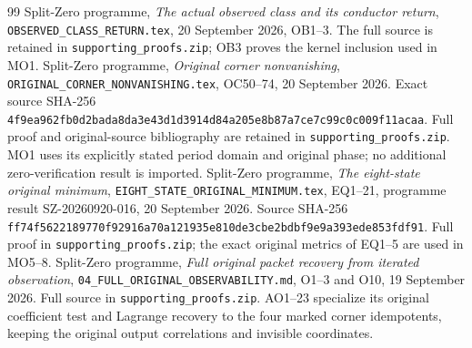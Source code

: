 \documentclass[11pt]{article}
\begin{document}
\begin{thebibliography}{99}
 Split-Zero programme, \emph{The actual observed class and its conductor return}, \texttt{OBSERVED\_CLASS\_RETURN.tex}, 20 September 2026, OB1--3. The full source is retained in \texttt{supporting\_proofs.zip}; OB3 proves the kernel inclusion used in MO1.
 Split-Zero programme, \emph{Original corner nonvanishing}, \texttt{ORIGINAL\_CORNER\_NONVANISHING.tex}, OC50--74, 20 September 2026. Exact source SHA-256 \texttt{4f9ea962fb0d2bada8da3e43d1d3914d84a205e8b87a7ce7c99c0c009f11acaa}. Full proof and original-source bibliography are retained in \texttt{supporting\_proofs.zip}. MO1 uses its explicitly stated period domain and original phase; no additional zero-verification result is imported.
 Split-Zero programme, \emph{The eight-state original minimum}, \texttt{EIGHT\_STATE\_ORIGINAL\_MINIMUM.tex}, EQ1--21, programme result SZ-20260920-016, 20 September 2026. Source SHA-256 \texttt{ff74f5622189770f92916a70a121935e810de3cbe2bdbf9e9a393ede853fdf91}. Full proof in \texttt{supporting\_proofs.zip}; the exact original metrics of EQ1--5 are used in MO5--8.
 Split-Zero programme, \emph{Full original packet recovery from iterated observation}, \texttt{04\_FULL\_ORIGINAL\_OBSERVABILITY.md}, O1--3 and O10, 19 September 2026. Full source in \texttt{supporting\_proofs.zip}. AO1--23 specialize its original coefficient test and Lagrange recovery to the four marked corner idempotents, keeping the original output correlations and invisible coordinates.


\end{thebibliography}
\end{document}

